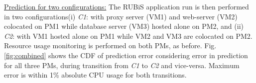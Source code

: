 \underline{Prediction for two configurations:} The RUBiS 
application run is then performed in
two configurations\textemdash{}(i) \textit{C1}: with proxy server (VM1)
and web-server (VM2) colocated
on PM1 while database server (VM3) hosted alone on PM2, and
(ii) \textit{C2}: with VM1
hosted alone on PM1 while VM2 and VM3 are colocated on PM2.
Resource usage monitoring is performed on both PMs, as before.
Fig.\ref{fig:combined} shows the CDF of prediction error
considering error in prediction for all three PMs, during transition
from \textit{C1} to \textit{C2} and vice-versa.
Maximum error is within 1\% absolute CPU usage for both transitions.

\begin{figure}
	\centering
	 ~~~~~~~~~
	 \\
	 ~~~~~~~~~

\end{figure}
